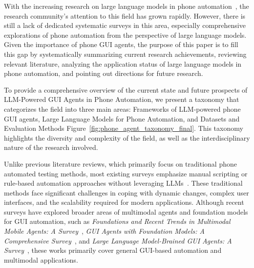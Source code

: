 With the increasing research on large language models in phone automation~\cite{wen2023droidbot,wen2024autodroid,wang2024mobileagentv1,wang2024mobileagentv2,liu2024vision,zhang2024mobileexperts,lu2024omniparser}, the research community's attention to this field has grown rapidly. However, there is still a lack of dedicated systematic surveys in this area, especially comprehensive explorations of phone automation from the perspective of large language models. Given the importance of phone GUI agents, the purpose of this paper is to fill this gap by systematically summarizing current research achievements, reviewing relevant literature, analyzing the application status of large language models in phone automation, and pointing out directions for future research.


To provide a comprehensive overview of the current state and future prospects of LLM-Powered GUI Agents in Phone Automation, we present a taxonomy that categorizes the field into three main areas: Frameworks of LLM-powered phone GUI agents, Large Language Models for Phone Automation, and Datasets and Evaluation Methods Figure~\ref{fig:phone_agent_taxonomy_final}. This taxonomy highlights the diversity and complexity of the field, as well as the interdisciplinary nature of the research involved.


% 




Unlike previous literature reviews, which primarily focus on traditional phone automated testing methods, most existing surveys emphasize manual scripting or rule-based automation approaches without leveraging LLMs~\cite{arnatovich2018systematic,deshmukh2023automated,nass2024overcoming,nass2021many,tramontana2019automated}. These traditional methods face significant challenges in coping with dynamic changes, complex user interfaces, and the scalability required for modern applications. Although recent surveys have explored broader areas of multimodal agents and foundation models for GUI automation, such as \textit{Foundations and Recent Trends in Multimodal Mobile Agents: A Survey}~\cite{wu2024foundations}, \textit{GUI Agents with Foundation Models: A Comprehensive Survey}~\cite{wang2024gui}, and \textit{Large Language Model-Brained GUI Agents: A Survey}~\cite{zhang2024large}, these works primarily cover general GUI-based automation and multimodal applications.

